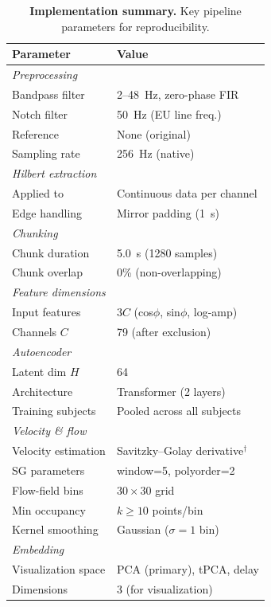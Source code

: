 \documentclass[5p,twocolumn,authoryear]{elsarticle}
\begin{document}
\begin{table}[h]
\centering
\caption{\textbf{Implementation summary.} Key pipeline parameters for reproducibility.}
\label{tab:implementation_summary}
\begin{tabular}{ll}
\toprule
\textbf{Parameter} & \textbf{Value} \\
\midrule
\multicolumn{2}{l}{\emph{Preprocessing}} \\
Bandpass filter & 2--48~Hz, zero-phase FIR \\
Notch filter & 50~Hz (EU line freq.) \\
Reference & None (original) \\
Sampling rate & 256~Hz (native) \\
\midrule
\multicolumn{2}{l}{\emph{Hilbert extraction}} \\
Applied to & Continuous data per channel \\
Edge handling & Mirror padding (1~s) \\
\midrule
\multicolumn{2}{l}{\emph{Chunking}} \\
Chunk duration & 5.0~s (1280 samples) \\
Chunk overlap & 0\% (non-overlapping) \\
\midrule
\multicolumn{2}{l}{\emph{Feature dimensions}} \\
Input features & $3C$ (cos$\phi$, sin$\phi$, log-amp) \\
Channels $C$ & 79 (after exclusion) \\
\midrule
\multicolumn{2}{l}{\emph{Autoencoder}} \\
Latent dim $H$ & 64 \\
Architecture & Transformer (2 layers) \\
Training subjects & Pooled across all subjects \\
\midrule
\multicolumn{2}{l}{\emph{Velocity \& flow}} \\
Velocity estimation & Savitzky--Golay derivative$^\dagger$ \\
SG parameters & window=5, polyorder=2 \\
Flow-field bins & $30 \times 30$ grid \\
Min occupancy & $k \geq 10$ points/bin \\
Kernel smoothing & Gaussian ($\sigma=1$ bin) \\
\midrule
\multicolumn{2}{l}{\emph{Embedding}} \\
Visualization space & PCA (primary), tPCA, delay \\
Dimensions & 3 (for visualization) \\

\end{tabular}
\end{table}
\end{document}

